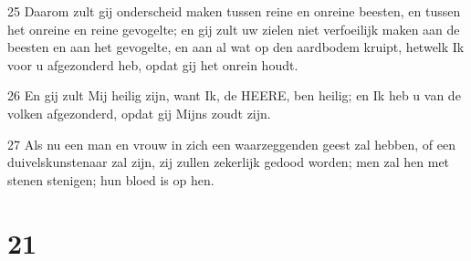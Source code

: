 \par 25 Daarom zult gij onderscheid maken tussen reine en onreine beesten, en tussen het onreine en reine gevogelte; en gij zult uw zielen niet verfoeilijk maken aan de beesten en aan het gevogelte, en aan al wat op den aardbodem kruipt, hetwelk Ik voor u afgezonderd heb, opdat gij het onrein houdt.
\par 26 En gij zult Mij heilig zijn, want Ik, de HEERE, ben heilig; en Ik heb u van de volken afgezonderd, opdat gij Mijns zoudt zijn.
\par 27 Als nu een man en vrouw in zich een waarzeggenden geest zal hebben, of een duivelskunstenaar zal zijn, zij zullen zekerlijk gedood worden; men zal hen met stenen stenigen; hun bloed is op hen.

\chapter{21}


